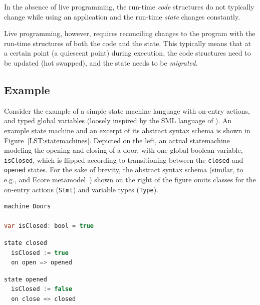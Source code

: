 \documentclass[english,submission]{programming}
\begin{document}
In the absence of live programming, the run-time \emph{code} structures do not typically
change while using an application and the run-time \emph{state} changes constantly.


Live programming, however, requires reconciling changes to the program with the run-time structures
of both the code and the state. This typically means that at a certain point (a quiescent point)
during execution, the code structures need to be updated (hot swapped), and the state needs to be \textit{migrated}.

\subsection{Example}
Consider the example of a simple state machine language with on-entry actions, and typed global
variables (loosely inspired by the SML language of \citet{vanRozen19}). An example state machine
and an excerpt of its abstract syntax schema is shown in Figure~\ref{LST:statemachines}. Depicted
on the left, an actual statemachine modeling the opening and closing of a door, with one global
boolean variable, \lstinline{isClosed}, which is flipped according to transitioning between the
\lstinline{closed} and \lstinline{opened} states. For the sake of brevity, the abstract syntax
schema (similar, to e.g., and Ecore metamodel~\cite{EMF}) shown on the right of the figure
omits classes for the on-entry actions (\lstinline{Stmt}) and variable types (\lstinline{Type}).

\noindent
\begin{adjustwidth}{-0.5em}{0em}
\begin{minipage}[t]{0.32\textwidth}
\begin{lstlisting}[language=java,morekeywords={machine,on,state,var},numbers=none]
machine Doors

var isClosed: bool = true
\end{lstlisting}
\end{minipage}
\begin{minipage}[t]{0.32\textwidth}
\begin{lstlisting}[language=java,morekeywords={machine,on,state,var},numbers=none]
state closed
  isClosed := true
  on open => opened
\end{lstlisting}
\end{minipage}
\begin{minipage}[t]{0.32\textwidth}
\begin{lstlisting}[language=java,morekeywords={machine,on,state,var},numbers=none]
state opened
  isClosed := false
  on close => closed
\end{lstlisting}
\end{minipage}
\end{adjustwidth}
\end{document}
